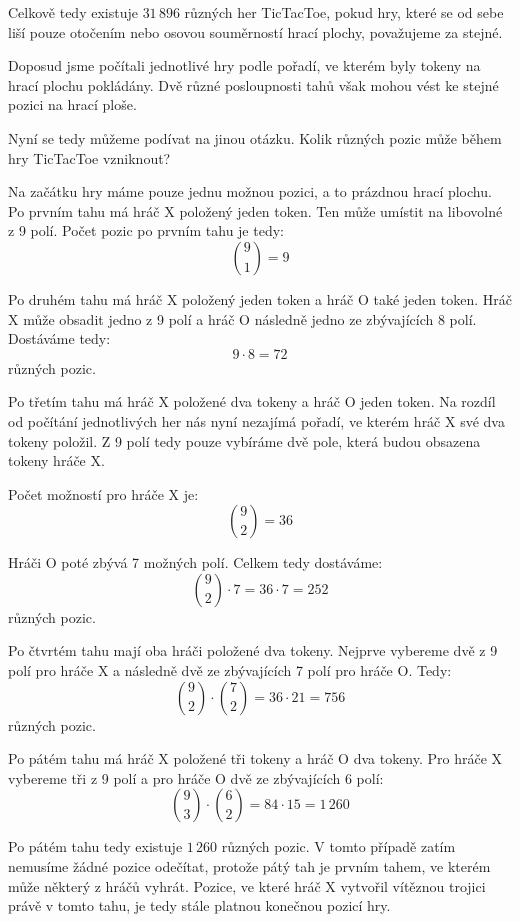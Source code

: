 \documentclass[12pt,a4paper]{article}
\begin{document}
Celkově tedy existuje $31\,896$ různých her TicTacToe, pokud hry, 
které se od sebe liší pouze otočením nebo osovou souměrností hrací plochy, 
považujeme za stejné.

Doposud jsme počítali jednotlivé hry podle pořadí, 
ve kterém byly tokeny na hrací plochu pokládány.
Dvě různé posloupnosti tahů však mohou vést ke stejné pozici na hrací ploše.

Nyní se tedy můžeme podívat na jinou otázku. 
Kolik různých pozic může během hry TicTacToe vzniknout?

Na začátku hry máme pouze jednu možnou pozici, a to prázdnou hrací plochu.
Po prvním tahu má hráč $\mathrm{X}$ položený jeden token. 
Ten může umístit na libovolné z 9 polí. Počet pozic po prvním tahu je tedy:
\[
    \binom{9}{1}=9
\]

Po druhém tahu má hráč $\mathrm{X}$ položený jeden token a hráč $\mathrm{O}$ také jeden token. 
Hráč $\mathrm{X}$ může obsadit jedno z 9 polí a hráč $\mathrm{O}$ následně jedno ze zbývajících 8 polí. 
Dostáváme tedy:
\[
    9\cdot8=72
\]
různých pozic.

Po třetím tahu má hráč $\mathrm{X}$ položené dva tokeny a hráč $\mathrm{O}$ jeden token.
Na rozdíl od počítání jednotlivých her nás nyní nezajímá pořadí, 
ve kterém hráč $\mathrm{X}$ své dva tokeny položil. 
Z 9 polí tedy pouze vybíráme dvě pole, která budou obsazena tokeny hráče $\mathrm{X}$.

Počet možností pro hráče $\mathrm{X}$ je:
\[
    \binom{9}{2}=36
\]

Hráči $\mathrm{O}$ poté zbývá 7 možných polí. Celkem tedy dostáváme:
\[
    \binom{9}{2}\cdot7=36\cdot7=252
\]
různých pozic.

Po čtvrtém tahu mají oba hráči položené dva tokeny. 
Nejprve vybereme dvě z 9 polí pro hráče $\mathrm{X}$ 
a následně dvě ze zbývajících 7 polí pro hráče $\mathrm{O}$. 
Tedy:
\[
    \binom{9}{2}\cdot\binom{7}{2}=36\cdot21=756
\]
různých pozic.

Po pátém tahu má hráč $\mathrm{X}$ položené tři tokeny a hráč $\mathrm{O}$ dva tokeny. 
Pro hráče $\mathrm{X}$ vybereme tři z 9 polí a pro hráče $\mathrm{O}$ dvě ze zbývajících 6 polí:
\[
    \binom{9}{3}\cdot\binom{6}{2}=84\cdot15=1\,260
\]

Po pátém tahu tedy existuje $1\,260$ různých pozic. 
V tomto případě zatím nemusíme žádné pozice odečítat, 
protože pátý tah je prvním tahem, ve kterém může některý z hráčů vyhrát. 
Pozice, ve které hráč $\mathrm{X}$ vytvořil vítěznou trojici právě v tomto tahu, 
je tedy stále platnou konečnou pozicí hry.
\end{document}

